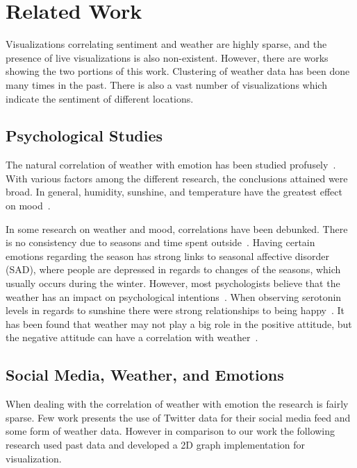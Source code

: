 \section{Related Work}

Visualizations correlating sentiment and weather are highly sparse, and the presence of live visualizations is also non-existent. However, there are works showing the two portions of this work. Clustering of weather data has been done many times in the past. There is also a vast number of visualizations which indicate the sentiment of different locations.

\subsection{Psychological Studies}

The natural correlation of weather with emotion has been studied profusely~\cite{bollen2011twitter,denissen2008effects,hannak2012tweetin,howarth1984multidimensional,lambert2002effect}. With various factors among the different research, the conclusions attained were broad. In general, humidity, sunshine, and temperature have the greatest effect on mood~\cite{bollen2011twitter}.

In some research on weather and mood, correlations have been debunked. There is no consistency due to seasons and time spent outside~\cite{denissen2008effects}. Having certain emotions regarding the season has strong links to seasonal affective disorder (SAD), where people are depressed in regards to changes of the seasons, which usually occurs during the winter. However, most psychologists believe that the weather has an impact on psychological intentions~\cite{hannak2012tweetin}. When observing serotonin levels in regards to sunshine there were strong relationships to being happy~\cite{howarth1984multidimensional}. It has been found that weather may not play a big role in the positive attitude, but the negative attitude can have a correlation with weather~\cite{lambert2002effect}.


\subsection{Social Media, Weather, and Emotions}

When dealing with the correlation of weather with emotion the research is fairly sparse. Few work presents the use of Twitter data for their social media feed and some form of weather data. However in comparison to our work the following research used past data and developed a 2D graph implementation for visualization.

